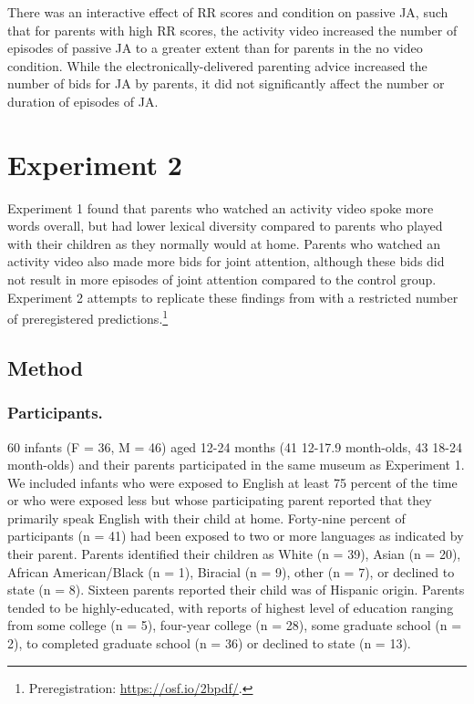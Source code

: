 \documentclass[man,floatsintext]{apa6}
\let\rmarkdownfootnote\footnote%
\def\footnote{\protect\rmarkdownfootnote}
\begin{document}
There was an interactive effect of RR scores and condition on passive JA, such that for parents with high RR scores, the activity video increased the number of episodes of passive JA to a greater extent than for parents in the no video condition.
While the electronically-delivered parenting advice increased the number of bids for JA by parents, it did not significantly affect the number or duration of episodes of JA.

\hypertarget{experiment-2}{%
\section{Experiment 2}\label{experiment-2}}

Experiment 1 found that parents who watched an activity video spoke more words overall, but had lower lexical diversity compared to parents who played with their children as they normally would at home.
Parents who watched an activity video also made more bids for joint attention, although these bids did not result in more episodes of joint attention compared to the control group.
Experiment 2 attempts to replicate these findings from with a restricted number of preregistered predictions.\footnote{Preregistration: \url{https://osf.io/2bpdf/}.}

\hypertarget{method-1}{%
\subsection{Method}\label{method-1}}

\hypertarget{participants.-1}{%
\subsubsection{Participants.}\label{participants.-1}}

60 infants (F = 36, M = 46) aged 12-24 months (41 12-17.9 month-olds, 43 18-24 month-olds) and their parents participated in the same museum as Experiment 1.
We included infants who were exposed to English at least 75 percent of the time or who were exposed less but whose participating parent reported that they primarily speak English with their child at home.
Forty-nine percent of participants (n = 41) had been exposed to two or more languages as indicated by their parent.
Parents identified their children as White (n = 39), Asian (n = 20), African American/Black (n = 1), Biracial (n = 9), other (n = 7), or declined to state (n = 8). Sixteen parents reported their child was of Hispanic origin.
Parents tended to be highly-educated, with reports of highest level of education ranging from some college (n = 5), four-year college (n = 28), some graduate school (n = 2), to completed graduate school (n = 36) or declined to state (n = 13).
\end{document}
